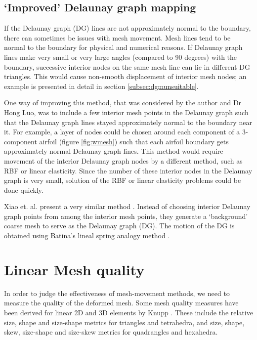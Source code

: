 \subsection{`Improved' Delaunay graph mapping}
 \label{sec:hybriddg}
 If the Delaunay graph (DG) lines are not approximately normal to the boundary, there can sometimes be issues with mesh movement. Mesh lines tend to be normal to the boundary for physical and numerical reasons. If Delaunay graph lines make very small or very large angles (compared to 90 degrees) with the boundary, successive interior nodes on the same mesh line can lie in different DG triangles. This would cause non-smooth displacement of interior mesh nodes; an example is presented in detail in section \ref{subsec:dgmunsuitable}.
 
 One way of improving this method, that was considered by the author and Dr Hong Luo, was to include a few interior mesh points in the Delaunay graph such that the Delaunay graph lines stayed approximately normal to the boundary near it. For example, a layer of nodes could be chosen around each component of a 3-component airfoil (figure \ref{fig:wmesh}) such that each airfoil boundary gets approximately normal Delaunay graph lines. This method would require movement of the interior Delaunay graph nodes by a different method, such as RBF or linear elasticity. Since the number of these interior nodes in the Delaunay graph is very small, solution of the RBF or linear elasticity problems could be done quickly.
 
 
 Xiao et. al. present a very similar method \cite{mm:hybriddg}. Instead of choosing interior Delaunay graph points from among the interior mesh points, they generate a `background' coarse mesh to serve as the Delaunay graph (DG). The motion of the DG is obtained using Batina's lineal spring analogy method \cite{mm:batina}.
 
 \section{Linear Mesh quality}
 \label{sec:lin-mesh-quality}
 In order to judge the effectiveness of mesh-movement methods, we need to measure the quality of the deformed mesh. Some mesh quality measures have been derived for linear 2D and 3D elements by Knupp \cite{qualknupp}. These include the relative size, shape and size-shape metrics for triangles and tetrahedra, and size, shape, skew, size-shape and size-skew metrics for quadrangles and hexahedra.
 
